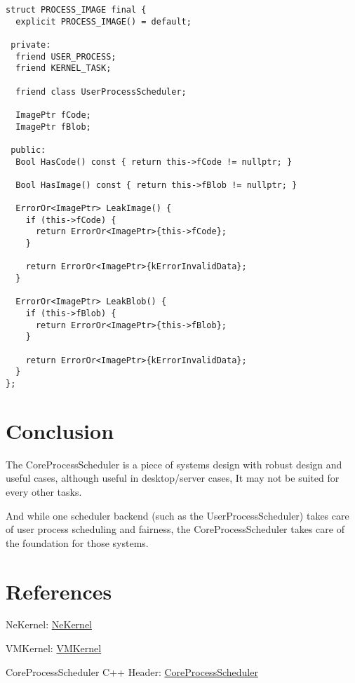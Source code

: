 \documentclass{article}
\begin{document}
\begin{verbatim}
struct PROCESS_IMAGE final {
  explicit PROCESS_IMAGE() = default;

 private:
  friend USER_PROCESS;
  friend KERNEL_TASK;

  friend class UserProcessScheduler;

  ImagePtr fCode;
  ImagePtr fBlob;

 public:
  Bool HasCode() const { return this->fCode != nullptr; }

  Bool HasImage() const { return this->fBlob != nullptr; }

  ErrorOr<ImagePtr> LeakImage() {
    if (this->fCode) {
      return ErrorOr<ImagePtr>{this->fCode};
    }

    return ErrorOr<ImagePtr>{kErrorInvalidData};
  }

  ErrorOr<ImagePtr> LeakBlob() {
    if (this->fBlob) {
      return ErrorOr<ImagePtr>{this->fBlob};
    }

    return ErrorOr<ImagePtr>{kErrorInvalidData};
  }
};

\end{verbatim}

\section{Conclusion}

{The CoreProcessScheduler is a piece of systems design with robust design and useful cases, although useful in desktop/server cases, It may not be suited for every other tasks.}

{And while one scheduler backend (such as the UserProcessScheduler) takes care of user process scheduling and fairness, the CoreProcessScheduler takes care of the foundation for those systems.}

\section{References}

{NeKernel}: \href{https://github.com/nekernel-org/nekernel}{NeKernel}

{VMKernel}: \href{https://snu.systems/specs/vmkernel}{VMKernel}

{CoreProcessScheduler C++ Header}: \href{https://github.com/nekernel-org/nekernel/blob/dev/dev/kernel/KernelKit/CoreProcessScheduler.h}{CoreProcessScheduler}
\end{document}
